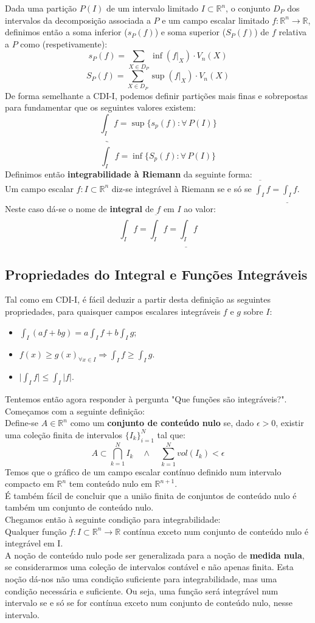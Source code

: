 \documentclass{article}
\begin{document}
Dada uma partição $P(I)$ de um intervalo limitado $I \subset \mathbb{R}^n$, o conjunto $D_P$ dos intervalos da decomposição associada a $P$ e um campo escalar limitado $f: \mathbb{R}^n \to \mathbb{R}$, definimos então a soma inferior ($s_P(f)$) e soma superior ($S_P(f)$) de $f$ relativa a $P$ como (respetivamente):
$$
s_P(f) = \sum_{X \in D_P} \inf(f|_X) \cdot V_n(X)
$$
$$
S_P(f) = \sum_{X \in D_P} \sup(f|_X) \cdot V_n(X)
$$
De forma semelhante a CDI-I, podemos definir partições mais finas e sobrepostas para fundamentar que os seguintes valores existem:
$$
\underline{\int_I} f = \sup \{ s_p(f): \forall \, P(I) \}
$$
$$
\overline{\int_I} f = \inf \{ S_p(f): \forall \, P(I) \}
$$
Definimos então \textbf{integrabilidade à Riemann} da seguinte forma:\\
Um campo escalar $f: I \subset \mathbb{R}^n$ diz-se integrável à Riemann se e só se $\overline{\int_I} f = \underline{\int_I} f$. Neste caso dá-se o nome de \textbf{integral} de $f$ em $I$ ao valor:
$$
\int_I f = \overline{\int_I} f = \underline{\int_I} f
$$

\subsection{Propriedades do Integral e Funções Integráveis}
Tal como em CDI-I, é fácil deduzir a partir desta definição as seguintes propriedades, para quaisquer campos escalares integráveis $f$ e $g$ sobre $I$:
\begin{itemize}
	\item $\int_I (af+bg) = a\int_I f + b \int_I g$;
	\item $f(x) \geq g(x) _{\forall x \in I} \Rightarrow \int_I f \geq \int_I g$.
	\item $\big| \int_I f \big| \leq \int_I |f|$.
\end{itemize}
Tentemos então agora responder à pergunta "Que funções são integráveis?". Começamos com a seguinte definição:\\
Define-se $A \in \mathbb{R}^n$ como um \textbf{conjunto de conteúdo nulo} se, dado $\epsilon >0$, existir uma coleção finita de intervalos $\{ I_k \}_{i=1}^N$ tal que:
$$
A \subset \bigcap_{k=1}^N I_k \quad \wedge \quad \sum_{k=1}^N vol(I_k) < \epsilon
$$
Temos que o gráfico de um campo escalar contínuo definido num intervalo compacto em $\mathbb{R}^n$ tem conteúdo nulo em $\mathbb{R}^{n+1}$.\\
É também fácil de concluir que a união finita de conjuntos de conteúdo nulo é também um conjunto de conteúdo nulo.\\
Chegamos então à seguinte condição para integrabilidade:\\
Qualquer função $f: I \subset \mathbb{R}^n \to \mathbb{R}$ contínua exceto num conjunto de conteúdo nulo é integrável em I.\\
A noção de conteúdo nulo pode ser generalizada para a noção de \textbf{medida nula}, se considerarmos uma coleção de intervalos contável e não apenas finita. Esta noção dá-nos não uma condição suficiente para integrabilidade, mas uma condição necessária e suficiente. Ou seja, uma função será integrável num intervalo se e só se for contínua exceto num conjunto de conteúdo nulo, nesse intervalo.\\ 
\end{document}
